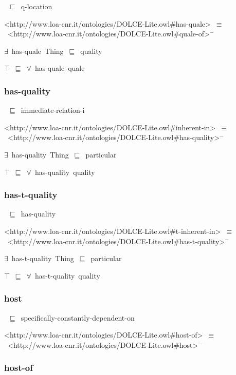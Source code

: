 \documentclass{article}
\begin{document}
~\ensuremath{\sqsubseteq}~q-location

<http://www.loa-cnr.it/ontologies/DOLCE-Lite.owl#has-quale>~\ensuremath{\equiv}~<http://www.loa-cnr.it/ontologies/DOLCE-Lite.owl#quale-of>\ensuremath{^-}

\ensuremath{\exists}~has-quale~Thing~\ensuremath{\sqsubseteq}~quality

\ensuremath{\top}~\ensuremath{\sqsubseteq}~\ensuremath{\forall}~has-quale~quale

\subsubsection*{has-quality}

~\ensuremath{\sqsubseteq}~immediate-relation-i

<http://www.loa-cnr.it/ontologies/DOLCE-Lite.owl#inherent-in>~\ensuremath{\equiv}~<http://www.loa-cnr.it/ontologies/DOLCE-Lite.owl#has-quality>\ensuremath{^-}

\ensuremath{\exists}~has-quality~Thing~\ensuremath{\sqsubseteq}~particular

\ensuremath{\top}~\ensuremath{\sqsubseteq}~\ensuremath{\forall}~has-quality~quality

\subsubsection*{has-t-quality}

~\ensuremath{\sqsubseteq}~has-quality

<http://www.loa-cnr.it/ontologies/DOLCE-Lite.owl#t-inherent-in>~\ensuremath{\equiv}~<http://www.loa-cnr.it/ontologies/DOLCE-Lite.owl#has-t-quality>\ensuremath{^-}

\ensuremath{\exists}~has-t-quality~Thing~\ensuremath{\sqsubseteq}~particular

\ensuremath{\top}~\ensuremath{\sqsubseteq}~\ensuremath{\forall}~has-t-quality~quality

\subsubsection*{host}

~\ensuremath{\sqsubseteq}~specifically-constantly-dependent-on

<http://www.loa-cnr.it/ontologies/DOLCE-Lite.owl#host-of>~\ensuremath{\equiv}~<http://www.loa-cnr.it/ontologies/DOLCE-Lite.owl#host>\ensuremath{^-}

\subsubsection*{host-of}
\end{document}
